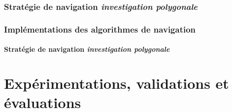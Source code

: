 \documentclass{beamer}
\begin{document}
			\subsubsection*{Stratégie de navigation \textit{investigation polygonale}}
				\begin{frame}
					\frametitle{Implémentations des algorithmes de navigation}
					\framesubtitle{Stratégie de navigation \textit{investigation polygonale}}
					\begin{figure}[H]
						\centering
					\end{figure}
				\end{frame}
	\section{Expérimentations, validations et évaluations}
\end{document}

